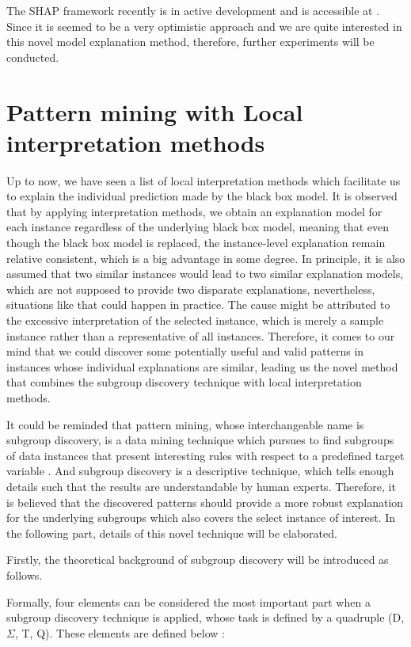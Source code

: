 The SHAP framework recently is in active development and is accessible at \cite{shap}. Since it is seemed to be a very optimistic approach and we are quite interested in this novel model explanation method, therefore, further experiments will be conducted. 

\section{Pattern mining with Local interpretation methods}

Up to now, we have seen a list of local interpretation methods which facilitate us to explain the individual prediction made by the black box model. It is observed that by applying interpretation methods, we obtain an explanation model for each instance regardless of the underlying black box model, meaning that even though the black box model is replaced, the instance-level explanation remain relative consistent, which is a big advantage in some degree. In principle, it is also assumed that two similar instances would lead to two similar explanation models, which are not supposed to provide two disparate explanations, nevertheless, situations like that could happen in practice. The cause might be attributed to the excessive interpretation of the selected instance, which is merely a sample instance rather than a representative of all instances. Therefore, it comes to our mind that we could discover some potentially useful and valid patterns in instances whose individual explanations are similar, leading us the novel method that combines the subgroup discovery technique with local interpretation methods. 

It could be reminded that pattern mining, whose interchangeable name is subgroup discovery, is a data mining technique which pursues to find subgroups of data instances that present interesting rules with respect to a predefined target variable \cite{herrera2011overview}. And subgroup discovery is a descriptive technique, which tells enough details such that the results are understandable by human experts. Therefore, it is believed that the discovered patterns should provide a more robust explanation for the underlying subgroups which also covers the select instance of interest. In the following part, details of this novel technique will be elaborated. 

Firstly, the theoretical background of subgroup discovery will be introduced as follows. 

Formally, four elements can be considered the most important part when a subgroup discovery technique is applied, whose task is defined by a quadruple (D, $\Sigma$, T, Q). These elements are defined below \cite{atzmueller2004towards} \cite{lemmerich2014novel}: 


